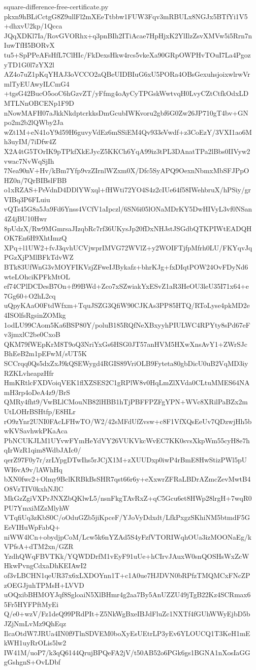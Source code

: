 \documentclass[11pt]{article}
\theoremstyle{definition}
\theoremstyle{remark}
\begin{document}
\begin{filecontents*}[overwrite]{square-difference-free-certificate.py}
pkxn9hBLiCctgG8Z9ullFl2mXEeTtbbw1FUW3Fqv3mRBULx8NGJx5BTfYi1V5+dhxvU2kp/1Qcca
JQqXDKl7Ia/RovGVORhx+q3pnBIh2ITiAcae7HpHjxK2YlIlzZsvXMVw5i5Rrn7nIuwTfH5BORvX
tu5+SpPPeAFsHfL7ClHIc/FkDexsHkw4rcs5vkeXa90GRpOWPHvTOuI7La4PgozyTD1G0l7zYX2l
AZ4o7uZ1pKqYHAJ3oVCCO2aQBeUIDBIuG6xU5PORa4OBsGexuhsjoixwlrwVrmlTyEUAwyILCmG4
+tgsG42BucO5ooC6hGzvZT/yFfmg4oAyCyTPGskWwtvqH0LvyCZtCtfkOdxLDMTLNnOBCENp1F9D
nNowMAFH07aJkkNkdptcrkksDmGcubIWKvoru2gbf6G0Zw26JP710gT4bv+GNpo2m2b2lQWby2Ja
wZt1M+eN41oY9d59H6guvyVdEz6mSSiEM4Qv933eVwdf+z3CoEzY/3VXI1ao6Mh3uyIM/7iDfw4Z
X2A4tG5TOrIK9pTPkfXkEJycZ5KKCh6YqA99iz3tPL3DAnatTPa2lBbs0IIVyw2vwac7NvWqSjIh
7Nea90nV+Hv/kBm7Yfp9vzZIrnlWZxm0X/Dfc5SyAPQ9OexnNbmxMbSFJPpOHZ0n/7QrBIBslFBB
o1xRZAS+PeVdnD4DDlYWxql+fHWti72YO4S4z2cIUe64f58IWehbruX/hPSiy/grVIBq3P6FLuiu
vQTs45G8a5Ja9Fd6Ynss4VCfV1aIpczl/6SN6i05lONaMDrKY5DwHIVyL3vf0NSan4Z4jBU10Hwr
8pUdzX/Rw9MGmrsaJIzqbRc7rf36UKysJp20fDxNHJstJSGdbQTKPIWtEADQHOK7En6H9XhtImzQ
XPq+l1UW2+fvJ3qvhUCVjwprIMVG72WVlZ+y2WOIFTjfpMfrh0LU/FKYqvJqPGzXjPMlBFkTdvWZ
BTk83UfWnG3vMOYFIKVzjZFweIJBykafz+bhrKJg+fxDIqtPOW24OvFDyNd6wteLOhciKPFkMtOL
ef74CPlDCDesB7On+f99BWd+Zco7xSZwiakYxESvZ1aR3HeOU3leU35I71x64+e7Gg60+O2hL2cq
uQpyKAaO0FtdWfxm+TquJSZG3QfiW90CJKAs3PP85HTQ/RToLyse4pkMD2e4ISOlfsRgsinZOMkg
1odLU99CAom5Ka6BSP80Y/poluB185RQfNeXBxyyhPIULWC4RPYty8sPd67eFv3jmxlC2be0CxoB
QKM79fWEpKrM8T9oQ3NriYxGs6HSG0JT57anHVM5HXwXnsAvY1+ZWrSJcBhEeB2m1pEFwM/sUT5K
SCCrqq0Qs5dxZxJ9kQSEWygd4RGIS89VriOLB9Fyteta80gbDicU0uB2VqMD3iyRZKLvheapzHfr
HmKRtlcFXDVoiqVEK1flXZSES2C1gRPlW8v0HqLmZlXVda0CLtuMMES64NAmH3rp4oDeA4z9/BrS
QMRy4fht9/VwBLlCMouNB82lHBB1hTjPBFFPZFgYPN+WVc8XRilPaBZx2mUtLOHrBSHtfp/E8HLr
rO9zYnr2UNI0FAcLFHwTO/W2/42sMFdUfZvsw+c8F1VfXQsEeUv7QDzwjHh5bwKVSavhwkPKaAca
PbNCUKJLM1UYvwFYmHeYdVY26VUKVkcWvEC7KK0svsXkpWm55cyH8e7hqIrWzR1qim8WdbJAIc0/
qerZ97F0y7r/zrLYpgDTwIhs5rJCjX1M+zXUUDxp0iwP4rBmE8HwStizPWl5pUWI6vA9v/lAWhHq
bXN0fwc2+Olmy9BclKRBkBsSHR7qst66r6y+eXxwrZFRaLBDrAZmcZevMwtB4O8VzTIV0kxhNJlC
MkGzZgiVXPrJNXZbQKlwL5/nsnFkgTAvRxZ+qC5Gcu6et8HWp28lrgH+7wqR0PU7YmxiMZzMlyhW
VTqfiUq3zKbS0C/oOduGZb5jiKpceF/YJoVyDdxdt/LfkPxgzSKhiNM5btmdF5GEeVIHuWpFabQ+
niWW4lCn+obydjpCoM/Lcw5k6nYZAd5S4yFzfVTORIWqhOUa3izMOONaEg/kVPfsA+dTM2xn/GZR
YzdhQWqFBVTKk/YQWDDrfM1vEyF91uUe+hCIrvJAuxW0snQOSHsWxZcWHkwPvngCdxaDhKEIAwI2
of3vLBCHN1qeUR37x6xLXDOYnn1T+c1A0ue7HJDVN0bRPfzTMQMCxFNcZPzOEGJjuhTPMsH+LVVD
uOQxibBHMOYJqf8SgloaiN5XlBHmr4g2aa7By5AnUZZU49jTgB22Kz4SCRmax65Fr5HYFPftMyEi
Q/e0+wzV/Fz1deQ99PRdPIt+Z5NkWgBxeIBJdFluZc1NXTf4fGUhWWyEjbD5bJZjNmLvMz9QhEqz
IlcaOtdW7JRUa4IN0f9TlnSDVEM0boXyEsUEtrLP3yEv6YLOUCQ1T3KeH1mEkWH1uyRrOLis5lw2
IW41M/uoP7/k3qQ6144QrujBPQeFA2jV/t50AB52o6PGk6gs1BGNA1nXosIaGGgGshgnS+OvLDbf

\end{filecontents*}
\end{document}
